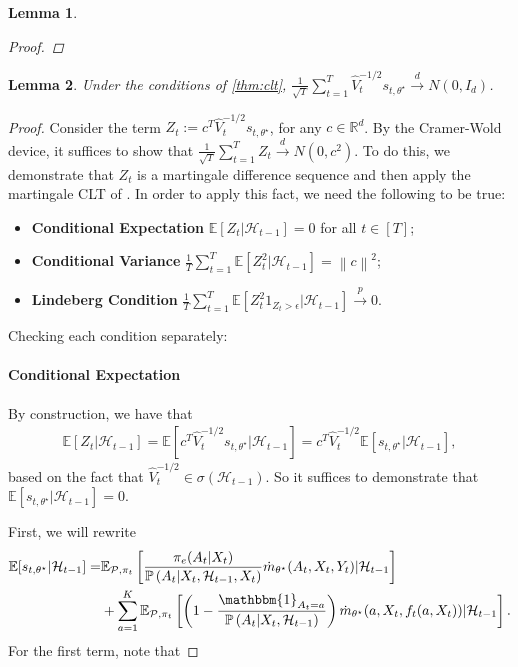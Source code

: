 \documentclass[11pt]{article}
\newcommand{\E}{\mathbb{E}}
\newcommand{\norm}[1]{\left\lVert#1\right\rVert}
\newtheorem{lemma}{Lemma}
\begin{document}
\begin{appendix}
\begin{lemma}
\begin{proof}
\end{proof}

\end{lemma}


\begin{lemma} \label{lemma:score_clt} Under the conditions of \cref{thm:clt},
$\frac{1}{\sqrt{T}}\sum_{t=1}^{T} \hat{V}_{t}^{-1/2} s_{t,\theta^{\star}} \overset{d}{\to} N(0,I_{d})$.
\end{lemma}
\begin{proof} Consider the term $Z_{t} := c^{T}\hat{V}_{t}^{-1/2} s_{t,\theta^{\star}}$, for any $c\in \mathbb{R}^{d}$. By the Cramer-Wold device, it suffices to show that $\frac{1}{\sqrt{T}} \sum_{t=1}^{T} Z_{t} \overset{d}{\to} N(0,c^{2})$. To do this, we demonstrate that $Z_{t}$ is a martingale difference sequence and then apply the martingale CLT of \cite{dvoretzky1972asymptotic}. In order to apply this fact, we need the following to be true:
\begin{itemize}
    \item \textbf{Conditional Expectation} $\E[Z_{t} | \mathcal{H}_{t-1}] = 0$ for all $t\in [T]$;
    \item \textbf{Conditional Variance} $\frac{1}{T}\sum_{t=1}^{T}\E[Z_{t}^{2} | \mathcal{H}_{t-1}] = \norm{c}^{2}$;
    \item \textbf{Lindeberg Condition} $\frac{1}{T}\sum_{t=1}^{T}\E[Z_{t}^{2}1_{Z_{t} > \epsilon} | \mathcal{H}_{t-1}] \overset{p}{\to} 0$.
    
\end{itemize}

Checking each condition separately:
\paragraph{Conditional Expectation}  By construction, we have that 
\begin{align*}
\E[Z_{t} | \mathcal{H}_{t-1}] = \E[c^{T}\hat{V}_{t}^{-1/2} s_{t,\theta^{\star}}| \mathcal{H}_{t-1}] =c^{T}\hat{V}_{t}^{-1/2}\E[s_{t,\theta^{\star}}| \mathcal{H}_{t-1}],
\end{align*}
based on the fact that  $\hat{V}_{t}^{-1/2} \in \sigma( \mathcal{H}_{t-1}) $. So it suffices to demonstrate that $\E[s_{t,\theta^{\star}}| \mathcal{H}_{t-1}] = 0 $. 

First, we will rewrite
\begin{align*}
    \E[s_{t,\theta^{\star}}| \mathcal{H}_{t-1}] = & \E_{\mathcal{P},\pi_{t}}\left[\frac{  \pi_{e}(A_{t} | X_{t})}{\mathbb{P} \left(A_{t}| X_{t}, \mathcal{H}_{t-1},X_t\right) } \dot{m}_{\theta^{\star}}(A_{t},X_{t},Y_{t}) |\mathcal{H}_{t-1}\right] \\
    & + \sum_{a =1}^{K} \E_{\mathcal{P},\pi_{t}} \left[ 
    \left( 1 - \frac{ \mathbbm{1}_{A_t=a}  }{  \mathbb{P} \left(A_{t}| X_{t}, \mathcal{H}_{t-1} \right)} \right)\dot{m}_{\theta^{\star}}(a,X_{t},f_{t}(a,X_{t})) | \mathcal{H}_{t-1} \right].  \\
\end{align*}
For the first term, note that


\end{proof}
\end{appendix}
\end{document}
